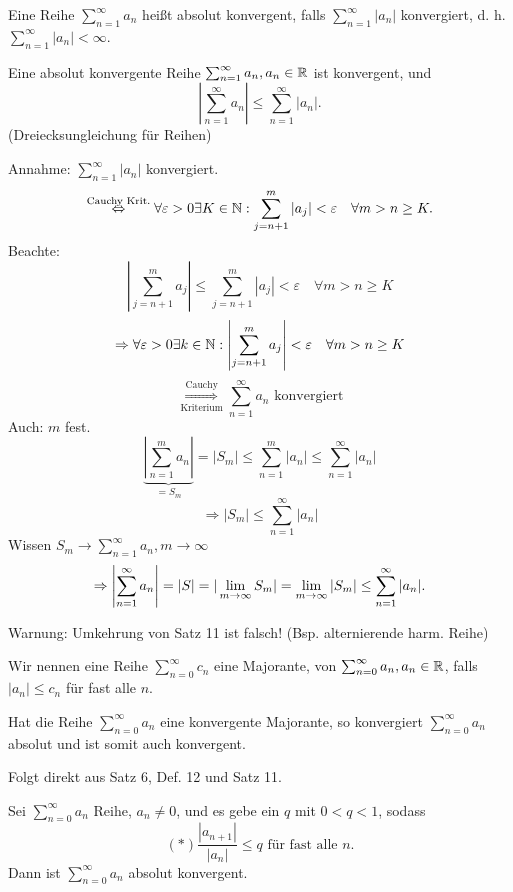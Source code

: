 \documentclass[../ana1.tex]{subfiles}
\begin{document}
\begin{defi}
	Eine Reihe \( \sum_{n=1}^{\infty} a_n \) heißt absolut konvergent, falls \( \sum_{n=1}^{\infty}|a_n| \) konvergiert, d. h. \( \sum_{n=1}^{\infty}|a_n|<\infty \).
\end{defi}
\begin{satz}
	Eine absolut konvergente Reihe \( \sum_{n=1}^{\infty}a_n, a_n \in\mathbb{R} \) ist konvergent, und
	\[ \left| \sum_{n=1}^{\infty}a_n \right| \leq \sum_{n=1}^{\infty}|a_n|.\] (Dreiecksungleichung für Reihen)
\end{satz}
\begin{bew}
	Annahme: \( \sum_{n=1}^{\infty} |a_n| \) konvergiert.
	\[ \overset{\text{Cauchy Krit.}}{\Leftrightarrow} \forall \varepsilon>0 \exists K\in\mathbb{N}: \sum_{j=n+1}^{m} |a_j| < \varepsilon\quad\forall m>n\geq K. \]
	Beachte: 
	\[ \left| \sum_{j=n+1}^{m}a_j \right| \leq \sum_{j=n+1}^{m}|a_j| < \varepsilon \quad \forall m>n\geq K \]
	\[\Rightarrow \forall \varepsilon > 0 \exists k \in \mathbb{N}: \left| \sum_{j = n+1}^{m} a_j \right| < \varepsilon \quad \forall m>n\geq K\]
	\[\overset{\text{Cauchy}}{\underset{\text{Kriterium}}{\Rightarrow}} \sum_{n=1}^{\infty} a_n \text{ konvergiert}\]
	Auch: \(m\) fest.
	\[ \underbrace{\left| \sum_{n=1}^{m}a_n \right|}_{=S_m}  = |S_m| \leq \sum_{n=1}^{m}|a_n| \leq \sum_{n=1}^{\infty}|a_n| \]
	\[ \Rightarrow |S_m| \leq \sum_{n=1}^{\infty}|a_n| \]
	Wissen \( S_m\rightarrow \sum_{n=1}^{\infty}a_n, m\rightarrow\infty \)
	\[ \Rightarrow \left|\sum_{n=1}^{\infty}a_n \right| = |S| = |\lim\limits_{m\rightarrow\infty}S_m| = \lim\limits_{m\rightarrow\infty}|S_m| \leq \sum_{n=1}^{\infty}|a_n|. \]
\end{bew}
\begin{bem}
	Warnung: Umkehrung von Satz 11 ist falsch! (Bsp. alternierende harm. Reihe)
\end{bem}
\begin{defi}
	Wir nennen eine Reihe \( \sum_{n=0}^{\infty}c_n \) eine Majorante, von \( \sum_{n=0}^{\infty}a_n, a_n\in\mathbb{R} \), falls \( |a_n| \leq c_n \) für fast alle \(n\).
\end{defi}
\begin{kor}
	Hat die Reihe \( \sum_{n=0}^{\infty}a_n \) eine konvergente Majorante, so konvergiert \( \sum_{n=0}^{\infty}a_n \) absolut und ist somit auch konvergent.
\end{kor}
\begin{bew}
	Folgt direkt aus Satz 6, Def. 12 und Satz 11.
\end{bew}
\begin{satz}[Quotientenkriterium]
	Sei \( \sum_{n=0}^{\infty}a_n \) Reihe, \(a_n\neq0\), und es gebe ein \(q\) mit \(0<q<1\), sodass
	\[(*) \frac{|a_{n+1}|}{|a_n|} \leq q \text{ für fast alle }n. \]
	Dann ist \( \sum_{n=0}^{\infty}a_n \) absolut konvergent.
\end{satz}
\end{document}
